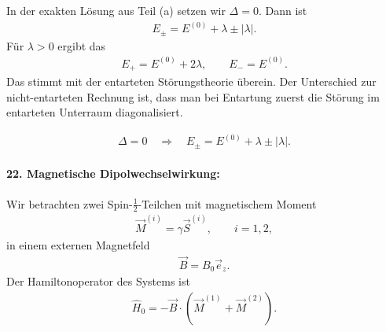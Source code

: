 \documentclass[11pt,a4paper]{scrartcl}
\newcommand{\abs}[1]{\left| #1 \right|}
\newcommand{\op}[1]{\hat{#1}}
\begin{document}
\begin{enumerate}[label=(\alph*)]
\begin{calculationbox}
            \begin{calculationbox}[title=Vergleich mit der exakten Lösung]
                In der exakten Lösung aus Teil (a) setzen wir $\Delta=0$. Dann ist
                \begin{align*}
                    E_\pm=E^{(0)}+\lambda\pm\abs\lambda.
                \end{align*}
                Für $\lambda>0$ ergibt das
                \begin{align*}
                    E_+=E^{(0)}+2\lambda,
                    \qquad
                    E_-=E^{(0)}.
                \end{align*}
                Das stimmt mit der entarteten Störungstheorie überein. Der Unterschied zur nicht-entarteten Rechnung ist, dass man bei Entartung zuerst die Störung im entarteten Unterraum diagonalisiert.

                \begin{solutionbox}[title=Vergleich]
                    \begin{align*}
                        \Delta=0
                        \quad\Longrightarrow\quad
                        E_\pm=E^{(0)}+\lambda\pm\abs\lambda.
                    \end{align*}
                \end{solutionbox}
            \end{calculationbox}
        \end{calculationbox}
    \end{enumerate}

    \paragraph{22. Magnetische Dipolwechselwirkung:}

    Wir betrachten zwei Spin-$\frac12$-Teilchen mit magnetischem Moment
    \begin{align*}
        \vec M^{(i)}=\gamma\vec S^{(i)},
        \qquad i=1,2,
    \end{align*}
    in einem externen Magnetfeld
    \begin{align*}
        \vec B=B_0\vec e_z.
    \end{align*}
    Der Hamiltonoperator des Systems ist
    \begin{align*}
        \op H_0=-\vec B\cdot(\vec M^{(1)}+\vec M^{(2)}).
    \end{align*}
\end{document}
